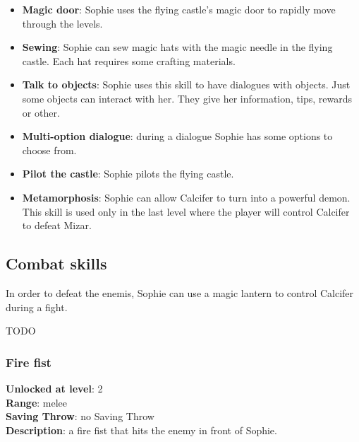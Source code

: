 \begin{itemize}
\item \textbf{Magic door}: Sophie uses the flying castle's magic door to rapidly move through the levels.
\item \textbf{Sewing}: Sophie can sew magic hats with the magic needle in the flying castle. Each hat requires some crafting materials.
\item \textbf{Talk to objects}: Sophie uses this skill to have dialogues with objects. Just some objects can interact with her. They give her information, tips, rewards or other.
\item \textbf{Multi-option dialogue}: during a dialogue Sophie has some options to choose from.
\item \textbf{Pilot the castle}: Sophie pilots the flying castle.
\item \textbf{Metamorphosis}: Sophie can allow Calcifer to turn into a powerful demon. This skill is used only in the last level where the player will control Calcifer to defeat Mizar.
\end{itemize}

\subsection{Combat skills}
In order to defeat the enemis, Sophie can use a magic lantern to control Calcifer during a fight.

TODO

\subsubsection{Fire fist}
\textbf{Unlocked at level}: 2 \\
\textbf{Range}: melee \\
\textbf{Saving Throw}: no Saving Throw \\
\textbf{Description}: a fire fist that hits the enemy in front of Sophie.

